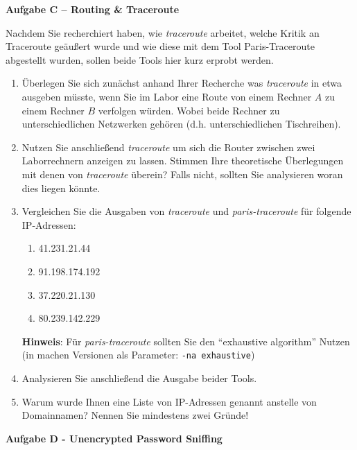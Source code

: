 \documentclass[paper=a4,fontsize=11pt]{scrartcl}%
\begin{document}
\begin{center}\Large{\textbf{Aufgabe C -- Routing \& Traceroute}}\end{center}\vskip0.25in
Nachdem Sie recherchiert haben, wie \emph{traceroute} arbeitet, welche Kritik an Traceroute geäußert wurde und wie diese mit dem Tool Paris-Traceroute abgestellt wurden, sollen beide Tools hier kurz erprobt werden.
\begin{enumerate}
	\item Überlegen Sie sich zunächst anhand Ihrer Recherche was \emph{traceroute} in etwa ausgeben müsste, wenn Sie im Labor eine Route von einem Rechner $A$ zu einem Rechner $B$ verfolgen würden. Wobei beide Rechner zu unterschiedlichen Netzwerken gehören (d.h. unterschiedlichen Tischreihen). 
	\item Nutzen Sie anschließend \emph{traceroute} um sich die Router zwischen zwei Laborrechnern anzeigen zu lassen. Stimmen Ihre theoretische Überlegungen mit denen von \emph{traceroute} überein? Falls nicht, sollten Sie analysieren woran dies liegen könnte.
	\item Vergleichen Sie die Ausgaben von \emph{traceroute} und \emph{paris-traceroute} für folgende IP-Adressen:
	\begin{enumerate}
		\item 41.231.21.44
		\item 91.198.174.192
		\item 37.220.21.130
		\item 80.239.142.229
	\end{enumerate}
	\textbf{Hinweis}: Für \emph{paris-traceroute} sollten Sie den \enquote{exhaustive algorithm} Nutzen (in machen Versionen als Parameter: \texttt{-na exhaustive})
	\item Analysieren Sie anschließend die Ausgabe beider Tools.
	\item Warum wurde Ihnen eine Liste von IP-Adressen genannt anstelle von Domainnamen? Nennen Sie mindestens zwei Gründe!
\end{enumerate}

\begin{center}
\Large{\textbf{Aufgabe D - Unencrypted Password Sniffing}}
\end{center}\vskip0.25in
\end{document}
